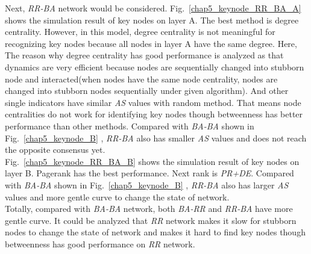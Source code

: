 Next, \textit{RR-BA} network would be considered. Fig.~\ref{chap5_keynode_RR_BA_A} shows the simulation result of key nodes on layer A. The best method is degree centrality. However, in this model, degree centrality is not meaningful for recognizing key nodes because all nodes in layer A have the same degree. Here, The reason why degree centrality has good performance is analyzed as that dynamics are very efficient because nodes are sequentially changed into stubborn node and interacted(when nodes have the same node centrality, nodes are changed into stubborn nodes sequentially under given algorithm). And other single indicators have similar \textit{AS} values with random method. That means node centralities do not work for identifying key nodes though betweenness has better performance than other methods. Compared with \textit{BA-BA} shown in Fig.~\ref{chap5_keynode_B} , \textit{RR-BA} also has smaller \textit{AS} values and does not reach the opposite consensus yet. \\
Fig.~\ref{chap5_keynode_RR_BA_B} shows the simulation result of key nodes on layer B. Pagerank has the best performance. Next rank is \textit{PR+DE}.  Compared with \textit{BA-BA} shown in Fig.~\ref{chap5_keynode_B} , \textit{RR-BA} also has larger \textit{AS} values and more gentle curve to change the state of network. \\ 
Totally, compared with \textit{BA-BA} network, both \textit{BA-RR} and \textit{RR-BA} have more gentle curve. It could be analyzed that \textit{RR} network makes it slow for stubborn nodes to change the state of network and makes it hard to find key nodes though betweenness has good performance on \textit{RR} network.  

